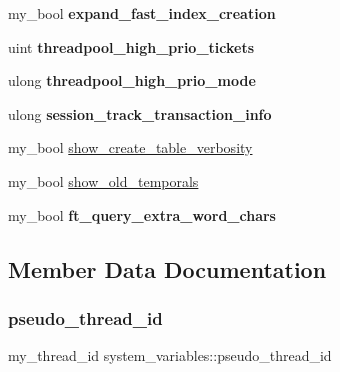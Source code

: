 \begin{DoxyCompactItemize}
\item 
\mbox{\label{structsystem__variables_af055f4909e68fe7482802e618530b3b7}} 
my\+\_\+bool {\bfseries expand\+\_\+fast\+\_\+index\+\_\+creation}
\item 
\mbox{\label{structsystem__variables_a5f629d940b929b4fb3c52dde3fc1fb66}} 
uint {\bfseries threadpool\+\_\+high\+\_\+prio\+\_\+tickets}
\item 
\mbox{\label{structsystem__variables_a2302fef63559b0d22e98a1da4adea585}} 
ulong {\bfseries threadpool\+\_\+high\+\_\+prio\+\_\+mode}
\item 
\mbox{\label{structsystem__variables_a97c2240cd62fd9c5e353772b9e4897ea}} 
ulong {\bfseries session\+\_\+track\+\_\+transaction\+\_\+info}
\item 
my\+\_\+bool \mbox{\hyperlink{structsystem__variables_ae6213a18e7a1e92a044c426cb3a10c8e}{show\+\_\+create\+\_\+table\+\_\+verbosity}}
\item 
my\+\_\+bool \mbox{\hyperlink{structsystem__variables_abf0021568f7fe0b7f4f6ea91d6e164fb}{show\+\_\+old\+\_\+temporals}}
\item 
\mbox{\label{structsystem__variables_ad924c619b2dd47eabbb42c66c1bccedc}} 
my\+\_\+bool {\bfseries ft\+\_\+query\+\_\+extra\+\_\+word\+\_\+chars}
\end{DoxyCompactItemize}


\subsection{Member Data Documentation}
\mbox{\label{structsystem__variables_af5efac8655d8d7d14c0f8954eedbdaae}} 
\subsubsection{\texorpdfstring{pseudo\+\_\+thread\+\_\+id}{pseudo\_thread\_id}}
{\footnotesize\ttfamily my\+\_\+thread\+\_\+id system\+\_\+variables\+::pseudo\+\_\+thread\+\_\+id}

